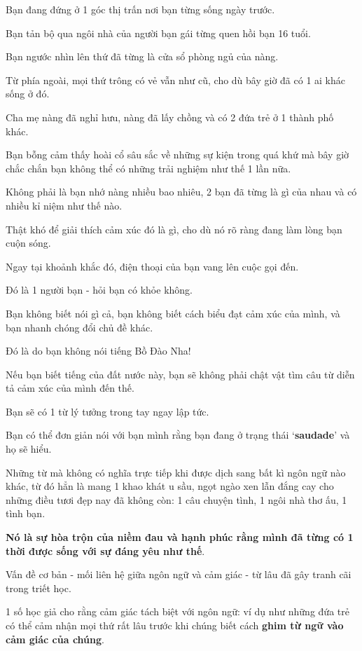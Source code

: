 \documentclass{article}
\begin{document}
%
Bạn đang đứng ở 1 góc thị trấn nơi bạn từng sống ngày trước.

Bạn tản bộ qua ngôi nhà của người bạn gái từng quen hồi bạn 16 tuổi.

Bạn ngước nhìn lên thứ đã từng là cửa sổ phòng ngủ của nàng.

Từ phía ngoài, mọi thứ trông có vẻ vẫn như cũ, cho dù bây giờ đã có 1 ai khác sống ở đó.

Cha mẹ nàng đã nghỉ hưu, nàng đã lấy chồng và có 2 đứa trẻ ở 1 thành phố khác.

Bạn bỗng cảm thấy hoài cổ sâu sắc về những sự kiện trong quá khứ mà bây giờ chắc chắn bạn không thể có những trải nghiệm như thế 1 lần nữa.

Không phải là bạn nhớ nàng nhiều bao nhiêu, 2 bạn đã từng là gì của nhau và có nhiều kỉ niệm như thế nào.

Thật khó để giải thích cảm xúc đó là gì, cho dù nó rõ ràng đang làm lòng bạn cuộn sóng.

Ngay tại khoảnh khắc đó, điện thoại của bạn vang lên cuộc gọi đến.

Đó là 1 người bạn - hỏi bạn có khỏe không.

Bạn không biết nói gì cả, bạn không biết cách biểu đạt cảm xúc của mình, và bạn nhanh chóng đổi chủ đề khác.

%
Đó là do bạn không nói tiếng Bồ Đào Nha!

Nếu bạn biết tiếng của đất nước này, bạn sẽ không phải chật vật tìm câu từ diễn tả cảm xúc của mình đến thế.

Bạn sẽ có 1 từ lý tưởng trong tay ngay lập tức.

Bạn có thể đơn giản nói với bạn mình rằng bạn đang ở trạng thái `\textbf{saudade}' và họ sẽ hiểu.

Những từ mà không có nghĩa trực tiếp khi được dịch sang bất kì ngôn ngữ nào khác, từ đó hẳn là mang 1 khao khát u sầu, ngọt ngào xen lẫn đắng cay cho những điều tươi đẹp nay đã không còn: 1 câu chuyện tình, 1 ngôi nhà thơ ấu, 1 tình bạn.

\textbf{Nó là sự hòa trộn của niềm đau và hạnh phúc rằng mình đã từng có 1 thời được sống với sự đáng yêu như thế}.

%
Vấn đề cơ bản - mối liên hệ giữa ngôn ngữ và cảm giác - từ lâu đã gây tranh cãi trong triết học.

1 số học giả cho rằng cảm giác tách biệt với ngôn ngữ: ví dụ như những đứa trẻ có thể cảm nhận mọi thứ rất lâu trước khi chúng biết cách \textbf{ghim từ ngữ vào cảm giác của chúng}.
\end{document}

